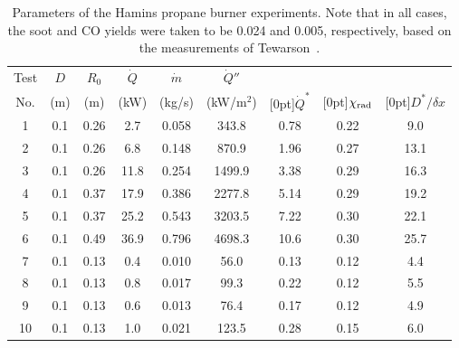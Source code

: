 \begin{table}[!h]
\centering
\caption[Parameters of the Hamins propane burner experiments]{Parameters of the Hamins propane burner experiments. Note that in all cases, the soot and CO yields were taken to be 0.024 and 0.005, respectively, based on the measurements of Tewarson~\cite{SFPE:Tewarson}.}
\begin{tabular}{|c|c|c|c|c|c|c||c|c|}
\hline
Test     & $D$      & $R_0$      & $\dot{Q}$   &  $\dot{m}$            &  $\dot{Q}''$   &               &           &           \\
No.      & (m)      & (m)        & (kW)        &  (kg/s)               &  (kW/m$^2$)    & \raisebox{1.5ex}[0pt]{$\dot{Q}^*$} & \raisebox{1.5ex}[0pt]{$\chi_{\rm rad}$} & \raisebox{1.5ex}[0pt]{$D^*/\delta x$} \\ \hline \hline
1        & 0.1      & 0.26       & 2.7         &  0.058                &  343.8         & 0.78          & 0.22      & 9.0          \\ \hline
2        & 0.1      & 0.26       & 6.8         &  0.148                &  870.9         & 1.96          & 0.27      & 13.1          \\ \hline
3        & 0.1      & 0.26       & 11.8        &  0.254                &  1499.9        & 3.38          & 0.29      & 16.3          \\ \hline
4        & 0.1      & 0.37       & 17.9        &  0.386                &  2277.8        & 5.14          & 0.29      & 19.2          \\ \hline
5        & 0.1      & 0.37       & 25.2        &  0.543                &  3203.5        & 7.22          & 0.30      & 22.1          \\ \hline
6        & 0.1      & 0.49       & 36.9        &  0.796                &  4698.3        & 10.6          & 0.30      & 25.7          \\ \hline
7        & 0.1      & 0.13       & 0.4         &  0.010                &  56.0          & 0.13          & 0.12      & 4.4          \\ \hline
8        & 0.1      & 0.13       & 0.8         &  0.017                &  99.3          & 0.22          & 0.12      & 5.5          \\ \hline
9        & 0.1      & 0.13       & 0.6         &  0.013                &  76.4          & 0.17          & 0.12      & 4.9          \\ \hline
10       & 0.1      & 0.13       & 1.0         &  0.021                &  123.5         & 0.28          & 0.15      & 6.0          \\ \hline

\end{tabular}
\end{table}
